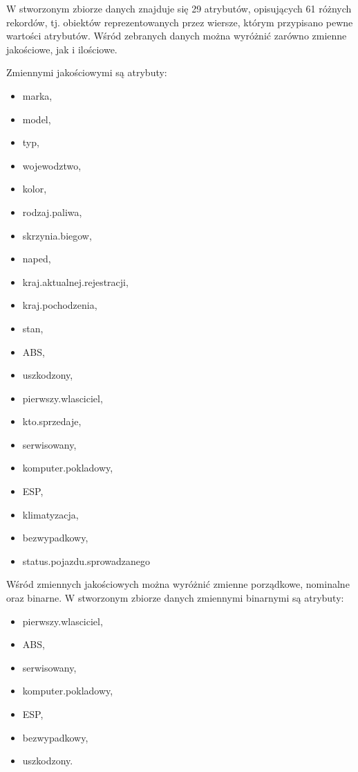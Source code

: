 \documentclass[12pt,a4paper]{report}
\begin{document}
W stworzonym zbiorze danych znajduje się 29 atrybutów, opisujących 61 różnych rekordów, tj. obiektów reprezentowanych przez wiersze, którym przypisano pewne wartości atrybutów. Wśród zebranych danych można wyróżnić zarówno zmienne jakościowe, jak i ilościowe. 

Zmiennymi jakościowymi są atrybuty:
\begin{multicols}{3} 
\begin{itemize}
	\item marka,
	\item model,
	\item typ,
	\item wojewodztwo,
	\item kolor,
	\item rodzaj.paliwa,
	\item skrzynia.biegow,
	\item naped,
	\item kraj.aktualnej.rejestracji,%
	\item kraj.pochodzenia,%
	\item stan,
	\item ABS,
	\item uszkodzony,
	\item pierwszy.wlasciciel,%
	\item kto.sprzedaje,%
	\item serwisowany,%
	\item komputer.pokladowy,%
	\item ESP,
	\item klimatyzacja,%
	\item bezwypadkowy,%
	\item status.pojazdu.sprowadzanego%
\end{itemize}
\end{multicols}


Wśród zmiennych jakościowych można wyróżnić zmienne porządkowe, nominalne oraz binarne. W stworzonym zbiorze danych zmiennymi binarnymi są atrybuty: 
\begin{multicols}{3}
\begin{itemize}
	\item pierwszy.wlasciciel,%
	\item ABS,
	\item serwisowany,%
	\item komputer.pokladowy, %
	\item ESP,
	\item bezwypadkowy,%
	\item uszkodzony.%
\end{itemize}
\end{multicols}
\end{document}
